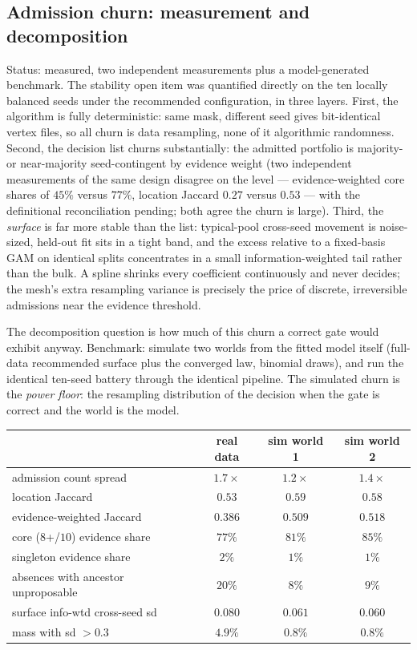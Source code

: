 \documentclass[11pt]{article}
\begin{document}
\subsection{Admission churn: measurement and decomposition}\label{sec:aug5-churn}

Status: measured, two independent measurements plus a model-generated benchmark.
The stability open item was quantified directly on the ten locally balanced
seeds under the recommended configuration, in three layers. First, the
algorithm is fully deterministic: same mask, different seed gives bit-identical
vertex files, so all churn is data resampling, none of it algorithmic
randomness. Second, the decision list churns substantially: the admitted
portfolio is majority- or near-majority seed-contingent by evidence weight
(two independent measurements of the same design disagree on the level ---
evidence-weighted core shares of $45\%$ versus $77\%$, location Jaccard
$0.27$ versus $0.53$ --- with the definitional reconciliation pending; both
agree the churn is large). Third, the \emph{surface} is far more stable than
the list: typical-pool cross-seed movement is noise-sized, held-out fit sits
in a tight band, and the excess relative to a fixed-basis GAM on identical
splits concentrates in a small information-weighted tail rather than the bulk.
A spline shrinks every coefficient continuously and never decides; the mesh's
extra resampling variance is precisely the price of discrete, irreversible
admissions near the evidence threshold.

The decomposition question is how much of this churn a correct gate would
exhibit anyway. Benchmark: simulate two worlds from the fitted model itself
(full-data recommended surface plus the converged law, binomial draws), and
run the identical ten-seed battery through the identical pipeline. The
simulated churn is the \emph{power floor}: the resampling distribution of the
decision when the gate is correct and the world is the model.

\begin{center}
\small
\begin{tabular}{lccc}
\toprule
 & real data & sim world 1 & sim world 2\\
\midrule
admission count spread          & $1.7\times$ & $1.2\times$ & $1.4\times$\\
location Jaccard                & $0.53$ & $0.59$ & $0.58$\\
evidence-weighted Jaccard       & $0.386$ & $0.509$ & $0.518$\\
core ($8$+/$10$) evidence share & $77\%$ & $81\%$ & $85\%$\\
singleton evidence share        & $2\%$ & $1\%$ & $1\%$\\
absences with ancestor unproposable & $20\%$ & $8\%$ & $9\%$\\
surface info-wtd cross-seed sd  & $0.080$ & $0.061$ & $0.060$\\
mass with sd $>0.3$             & $4.9\%$ & $0.8\%$ & $0.8\%$\\
\bottomrule
\end{tabular}
\end{center}
\end{document}
